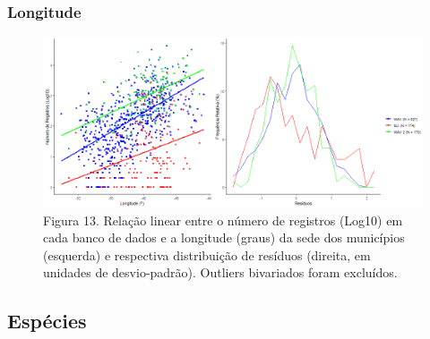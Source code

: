 \newpage

\texto

\subsubsection{Longitude}

\begin{figure}[h!]
\centering
\includegraphics[width = 15cm]{Imagens/31533.png}
\\{\scriptsize Figura 13. Relação linear entre o número de registros (Log10) em cada banco de dados e a longitude (graus) da sede dos municípios (esquerda) e respectiva distribuição de resíduos (direita, em unidades de desvio-padrão). Outliers bivariados foram excluídos.}
\end{figure}

\texto


\subsection{Espécies}

\texto



